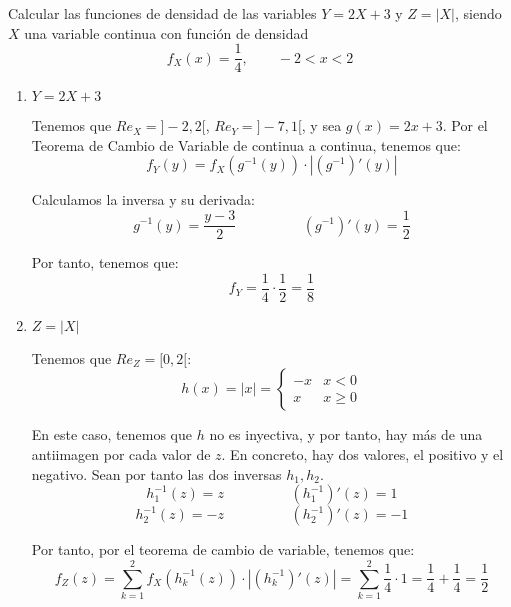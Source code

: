 \begin{ejercicio}
    Calcular las funciones de densidad de las variables $Y = 2X + 3$ y $Z = |X|$, siendo $X$ una variable continua con función de densidad
    \begin{equation*}
        f_X(x)=\frac{1}{4},\qquad -2<x<2
    \end{equation*}

    \begin{enumerate}
        \item $Y=2X+3$

        Tenemos que $Re_X=]-2,2[$, $Re_Y=]-7,1[$, y sea $g(x)=2x+3$. Por el Teorema de Cambio de Variable de continua a continua, tenemos que:
        \begin{equation*}
            f_Y(y)=f_X(g^{-1}(y))\cdot |(g^{-1})'(y)|
        \end{equation*}

        Calculamos la inversa y su derivada:
        \begin{equation*}
            g^{-1}(y)=\frac{y-3}{2}
            \hspace{2cm}
            (g^{-1})'(y) = \frac{1}{2} 
        \end{equation*}

        Por tanto, tenemos que:
        \begin{equation*}
            f_Y = \frac{1}{4}\cdot \frac{1}{2} = \frac{1}{8}
        \end{equation*}

        \item $Z=|X|$

        Tenemos que $Re_{Z}=[0,2[$:
        \begin{equation*}
            h(x)=|x|=\left\{\begin{array}{cc}
                -x & x<0 \\
                 x & x\geq 0
            \end{array}\right.
        \end{equation*}

        En este caso, tenemos que $h$ no es inyectiva, y por tanto, hay más de una antiimagen por cada valor de $z$. En concreto, hay dos valores, el positivo y el negativo. Sean por tanto las dos inversas $h_1,h_2$.
        \begin{equation*}
            h_1^{-1}(z)=z
            \hspace{2cm}
            (h_1^{-1})'(z) = 1
        \end{equation*}
        \begin{equation*}
            h_2^{-1}(z)=-z
            \hspace{2cm}
            (h_2^{-1})'(z) = -1
        \end{equation*}

        Por tanto, por el teorema de cambio de variable, tenemos que:
        \begin{equation*}
            f_Z(z)=\sum_{k=1}^2 f_X(h_k^{-1}(z))\cdot |(h_k^{-1})'(z)| = \sum_{k=1}^2 \frac{1}{4}\cdot 1 = \frac{1}{4} + \frac{1}{4} = \frac{1}{2}
        \end{equation*}
    \end{enumerate}
\end{ejercicio}


